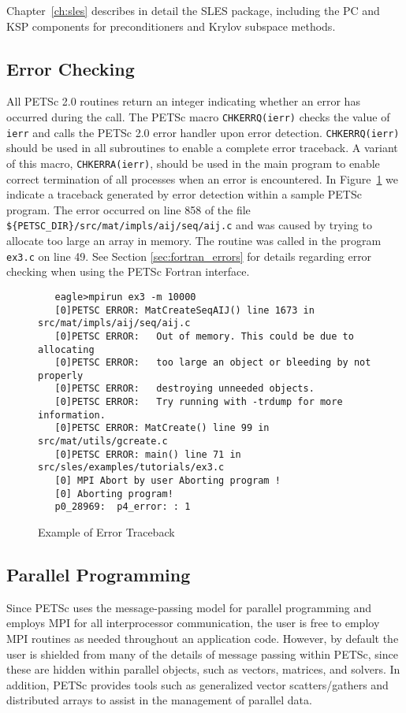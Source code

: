 Chapter~\ref{ch:sles} describes in detail the SLES package, including
the PC and KSP components for preconditioners and Krylov subspace methods.

\subsection*{Error Checking}

All PETSc 2.0 routines return an integer indicating whether an error
has occurred during the call.  The PETSc macro {\tt CHKERRQ(ierr)}
checks the value of {\tt ierr} and calls the PETSc 2.0 error handler
upon error detection.  {\tt CHKERRQ(ierr)} should be used in all
subroutines to enable a complete error traceback.  A variant of this
macro, {\tt CHKERRA(ierr)}, should be used in the main program to
enable correct termination of all processes when an error is
encountered.  In Figure~\ref{fig:traceback} we indicate a
traceback generated by error detection within a sample PETSc
program. The error occurred on line 858 of the file {\tt
\$\{PETSC\_DIR\}/src/mat/impls/aij/seq/aij.c} and was caused by trying to allocate too
large an array in memory. The routine was called in the program 
{\tt ex3.c} on line 49.  See Section \ref{sec:fortran_errors} for
details regarding error checking when using the PETSc Fortran interface.

\begin{figure}[H]
{\small
\begin{verbatim}
   eagle>mpirun ex3 -m 10000
   [0]PETSC ERROR: MatCreateSeqAIJ() line 1673 in src/mat/impls/aij/seq/aij.c
   [0]PETSC ERROR:   Out of memory. This could be due to allocating
   [0]PETSC ERROR:   too large an object or bleeding by not properly
   [0]PETSC ERROR:   destroying unneeded objects.
   [0]PETSC ERROR:   Try running with -trdump for more information. 
   [0]PETSC ERROR: MatCreate() line 99 in src/mat/utils/gcreate.c  
   [0]PETSC ERROR: main() line 71 in src/sles/examples/tutorials/ex3.c  
   [0] MPI Abort by user Aborting program !
   [0] Aborting program!
   p0_28969:  p4_error: : 1
\end{verbatim}
}
\nobreak
\caption{Example of Error Traceback}
\label{fig:traceback}
\end{figure}

\subsection*{Parallel Programming}

Since PETSc uses the message-passing model for
parallel programming and employs MPI for all interprocessor
communication, the user is free to employ MPI routines as needed
throughout an application code.  However, by default the user is
shielded from many of the details of message passing within PETSc,
since these are hidden within parallel objects, such as vectors,
matrices, and solvers.  In addition, PETSc provides tools such as
generalized vector scatters/gathers and distributed arrays to assist
in the management of parallel data.

